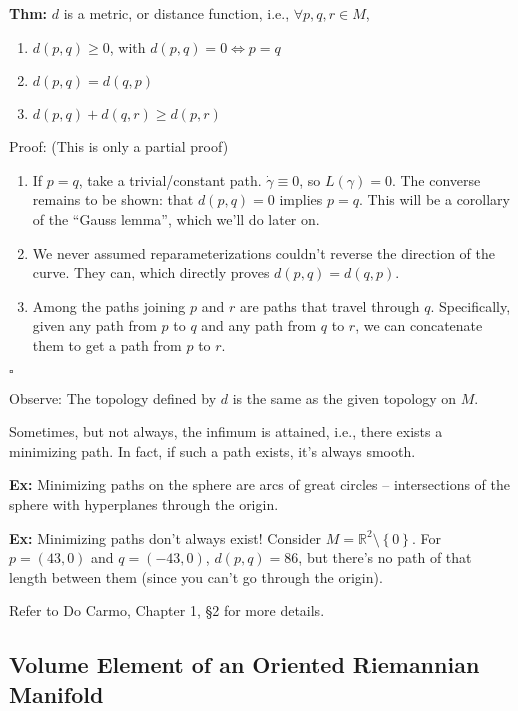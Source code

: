 \documentclass[10pt,letterpaper]{article}
\newcommand{\n}{\hfill\break}
\newcommand{\nn}{\vspace{0.5\baselineskip}\n}
\newcommand{\up}{\vspace{-\baselineskip}}
\newcommand{\hangblock}[2]{\par\noindent\settowidth{\hangindent}{\textbf{#1: }}\textbf{#1: }\nolinebreak#2}
\newcommand{\thm}[1]{\hangblock{Thm}{#1}}
\newcommand{\ex}[1]{\hangblock{Ex}{#1}}
\newcommand{\proven}{\;$\square$\n}
\newcommand{\set}[1]{\left\{#1\right\}}
\newcommand{\reals}{\mathbb{R}}
\newcommand{\R}{\reals}
\newcommand{\cut}{\setminus}
\let\sectionSymbol\S
\let\S\relax
\newcommand{\S}{\mathbb{S}}
\begin{document}
\thm{
	$d$ is a metric, or distance function, i.e., $\forall{}p,q,r\in{}M$,
	\begin{enumerate}[topsep=0pt, itemsep=0pt, leftmargin=4\parindent, label=(\roman*)]
		\item $d(p,q)\ge{}0$, with $d(p,q)=0\Leftrightarrow{}p=q$
		\item $d(p,q)=d(q,p)$
		\item $d(p,q)+d(q,r)\ge{}d(p,r)$
	\end{enumerate}\up\nn
	Proof: (This is only a partial proof)
	\begin{enumerate}[topsep=0pt, itemsep=0pt, leftmargin=4\parindent, label=(\roman*)]
		\item If $p=q$, take a trivial/constant path. $\dot\gamma\equiv{}0$, so $L(\gamma)=0$. The converse remains to be shown: that $d(p,q)=0$ implies $p=q$. This will be a corollary of the ``Gauss lemma'', which we'll do later on.
		\item We never assumed reparameterizations couldn't reverse the direction of the curve. They can, which directly proves $d(p,q)=d(q,p)$.
		\item Among the paths joining $p$ and $r$ are paths that travel through $q$. Specifically, given any path from $p$ to $q$ and any path from $q$ to $r$, we can concatenate them to get a path from $p$ to $r$.
	\end{enumerate}\up\n
	\proven
}

\par\noindent
Observe: The topology defined by $d$ is the same as the given topology on $M$.\n

\par\noindent
Sometimes, but not always, the infimum is attained, i.e., there exists a minimizing path. In fact, if such a path exists, it's always smooth.\n

\ex{
	Minimizing paths on the sphere are arcs of great circles -- intersections of the sphere with hyperplanes through the origin.\n
}

\ex{
	Minimizing paths don't always exist! Consider $M=\R^{2}\cut\set{0}$. For $p=(43,0)$ and $q=(-43,0)$, $d(p,q)=86$, but there's no path of that length between them (since you can't go through the origin).\n
}

\par\noindent
Refer to Do Carmo, Chapter 1, \sectionSymbol{}2 for more details.\n

\subsection*{Volume Element of an Oriented Riemannian Manifold}
\end{document}
